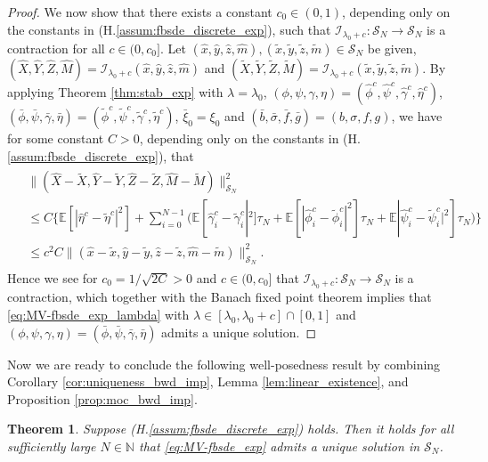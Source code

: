 \documentclass[11pt]{article}
\numberwithin{equation}{section}
\newtheorem{Theorem}{Theorem}[section]
\theoremstyle{definition}
\theoremstyle{remark}
\def\to{\rightarrow}
\def\l{\label}  \def\f{\frac}  \def\fa{\forall}
\def\cI{\mathcal{I}}
\def\cS{\mathcal{S}}
\def\sE{{\mathbb{E}}}
\def\sN{{\mathbb{N}}}
\begin{document}
\begin{proof}
We now show that there exists a constant $c_0\in (0,1)$, 
depending only on the constants in  (H.\ref{assum:fbsde_discrete_exp}),
such that $\cI_{\lambda_0+c}:\cS_N\to \cS_N$ is a contraction for  
all $c\in (0, c_0]$.
Let $(\hat{x},\hat{y},\hat{z},\hat{m}), (\tilde{x}, \tilde{y}, \tilde{z}, \tilde{m})\in \cS_N$ be  given, 
 $(\hat{X},\hat{Y},\hat{Z},\hat{M})=\cI_{\lambda_0+c}(\hat{x},\hat{y},\hat{z},\hat{m})$
 and
$(\tilde{X}, \tilde{Y}, \tilde{Z}, \tilde{M})=\cI_{\lambda_0+c}(\tilde{x}, \tilde{y}, \tilde{z}, \tilde{m})$.
By applying Theorem \ref{thm:stab_exp} 
with $\lambda=\lambda_0$, $(\phi,\psi,\gamma,\eta)=(\hat{\phi}^c,\hat{\psi}^c,\hat{\gamma}^c,\hat{\eta}^c)$,
$(\bar{\phi},\bar{\psi},\bar{\gamma},\bar{\eta})=(\tilde{\phi}^c,\tilde{\psi}^c,\tilde{\gamma}^c,\tilde{\eta}^c)$,
$\bar{\xi}_0=\xi_0$
and $(\bar{b},\bar{\sigma},\bar{f},\bar{g})=({b},{\sigma},{f},{g})$,
we have for some constant $C>0$, depending only on the constants in  (H.\ref{assum:fbsde_discrete_exp}),
that
\begin{align*}
\begin{split}
&
\|(\hat{X}-\tilde{X},
\hat{Y}-\tilde{Y},\hat{Z}-\tilde{Z},\hat{M}-\tilde{M})\|^2_{\cS_N}
\\
&\le
C\bigg\{
\sE[ | \hat{\eta}^c-\tilde{\eta}^c|^2]
+\sum_{i=0}^{N-1}
\bigg(
\sE[ \hat{\gamma}^c_i-\tilde{\gamma}^c_i|^2]\tau_N
+\sE[|\hat{\phi}^c_{i}-\tilde{\phi}^c_{i}|^2]\tau_N
+
\sE|\hat{\psi}^c_i-\tilde{\psi}^c_i|^2]\tau_N
\bigg)
\bigg\}
\\
&\le c^2C\|(\hat{x}-\tilde{x},
\hat{y}-\tilde{y},\hat{z}-\tilde{z},\hat{m}-\tilde{m})\|^2_{\cS_N}.
\end{split}
\end{align*}
Hence we see for $c_0=1/{\sqrt{2C}}>0$ and $c\in (0,c_0]$ that
$\cI_{\lambda_0+c}:\cS_N\to \cS_N$ is a contraction,
which together with the  Banach fixed point theorem  implies that \eqref{eq:MV-fbsde_exp_lambda} with $\lambda\in [\lambda_0,\lambda_0+c]\cap [0,1]$
and $(\phi,\psi,\gamma,\eta)=(\bar{\phi},\bar{\psi},\bar{\gamma},\bar{\eta})$
  admits a unique solution.
\end{proof}


Now
we are ready to conclude the following well-posedness result 
 by
combining Corollary \ref{cor:uniqueness_bwd_imp}, Lemma \ref{lem:linear_existence},
 and Proposition \ref{prop:moc_bwd_imp}.
 
 
\begin{Theorem}
\l{thm:wp_bwd_imp}
Suppose  (H.\ref{assum:fbsde_discrete_exp}) holds.
Then  it holds for all sufficiently large $N\in \sN$ that 
 \eqref{eq:MV-fbsde_exp} admits a unique solution in $\cS_N$.
\end{Theorem}
\end{document}
